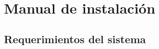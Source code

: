 	\titleformat{\chapter}[hang]
	{\normalfont\bfseries}{\chaptertitlename\ \thechapter:}{1em}{}
	\makeatletter
	\def\ttl@mkchap@i#1#2#3#4#5#6#7{%
    \ttl@assign\@tempskipa#3\relax\beforetitleunit
    \vspace{\@tempskipa}%
    \global\@afterindenttrue
    \ifcase#5 \global\@afterindentfalse\fi
    \ttl@assign\@tempskipb#4\relax\aftertitleunit
    \ttl@topmode{\@tempskipb}{%
        \ttl@select{#6}{#1}{#2}{#7}}%
    \ttl@finmarks  %
    \@ifundefined{ttlp@#6}{}{\ttlp@write{#6}}}
    \makeatother

\appendix
\clearpage
\addappheadtotoc
\appendixpage

\chapter{Manual de instalaci\'{o}n}
\thispagestyle{fancy}

\section*{Requerimientos del sistema}

